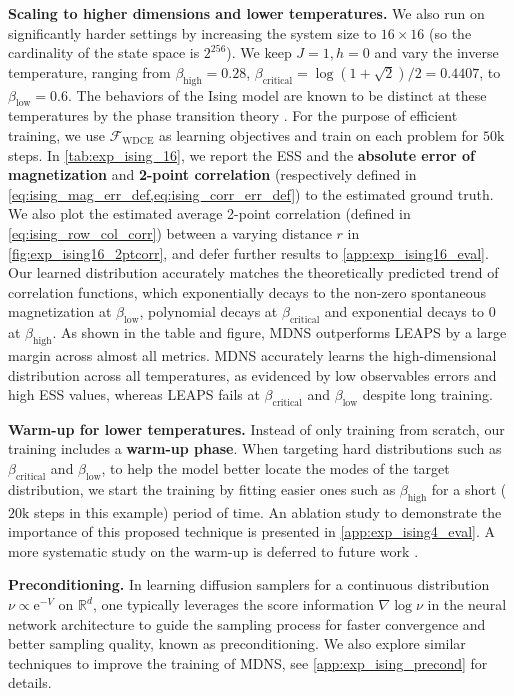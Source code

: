 \documentclass{article}
\theoremstyle{remark}
\newcommand{\e}{\mathrm{e}}
\newcommand{\R}{\mathbb{R}}
\newcommand{\cF}{\mathcal{F}}
\newcommand{\betah}{\beta_\mathrm{high}}
\newcommand{\betac}{\beta_\mathrm{critical}}
\newcommand{\betal}{\beta_\mathrm{low}}
\begin{document}
\textbf{Scaling to higher dimensions and lower temperatures.} We also run on significantly harder settings by increasing the system size to $16 \times 16$ (so the cardinality of the state space is $2^{256}$). We keep $J = 1, h=0$ and vary the inverse temperature, ranging from $\betah=0.28$, $\betac=\log(1 + \sqrt{2})/2 = 0.4407$, to $\betal=0.6$. The behaviors of the Ising model are known to be distinct at these temperatures by the phase transition theory \cite{kramers1941statistics,onsager1944crystal}. For the purpose of efficient training, we use $\cF_{\mathrm{WDCE}}$ as learning objectives and train on each problem for $50\mathrm{k}$ steps. In \cref{tab:exp_ising_16}, we report the ESS and the \textbf{absolute error of magnetization} and \textbf{2-point correlation} (respectively defined in \cref{eq:ising_mag_err_def,eq:ising_corr_err_def}) to the estimated ground truth. We also plot the estimated average 2-point correlation (defined in \eqref{eq:ising_row_col_corr}) between a varying distance $r$ in \cref{fig:exp_ising16_2ptcorr}, and defer further results to \cref{app:exp_ising16_eval}. Our learned distribution accurately matches the theoretically predicted trend of correlation functions, which exponentially decays to the non-zero spontaneous magnetization at $\betal$, polynomial decays at $\betac$ and exponential decays to $0$ at $\betah$. As shown in the table and figure, MDNS outperforms LEAPS by a large margin across almost all metrics. MDNS accurately learns the high-dimensional distribution across all temperatures, as evidenced by low observables errors and high ESS values, whereas LEAPS fails at $\betac$ and $\betal$ despite long training.

\textbf{Warm-up for lower temperatures.} Instead of only training from scratch, our training includes a \textbf{warm-up phase}. When targeting hard distributions such as $\betac$ and $\betal$, to help the model better locate the modes of the target distribution, we start the training by fitting easier ones such as $\betah$ for a short ($20\mathrm{k}$ steps in this example) period of time. An ablation study to demonstrate the importance of this proposed technique is presented in \cref{app:exp_ising4_eval}.
A more systematic study on the warm-up is deferred to future work \cite{guo2025proximal}.

\textbf{Preconditioning.} In learning diffusion samplers for a continuous distribution $\nu\propto\e^{-V}$ on $\R^d$, one typically leverages the score information $\nabla\log\nu$ in the neural network architecture to guide the sampling process for faster convergence and better sampling quality, known as preconditioning. We also explore similar techniques to improve the training of MDNS, see \cref{app:exp_ising_precond} for details.
\end{document}
